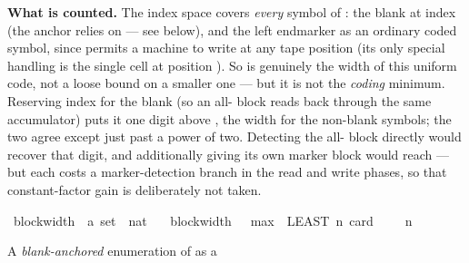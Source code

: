 \begin{isabellebody}
\begin{isamarkuptext}
  \textbf{What is counted.}  The index space 
  covers \emph{every} symbol of \isa{{\isasymGamma}}: the blank at index
   (the anchor  relies on --- see below), and
  the left endmarker  as an ordinary coded symbol, since
   permits a machine to write  at any tape
  position (its only special handling is the single  cell at
  position ).  So  is genuinely the width of
  this uniform code, not a loose bound on a smaller one --- but it is not
  the \emph{coding} minimum.  Reserving index  for the
  blank (so an all- block reads back through the same
  accumulator) puts it one digit above
  , the width for the
   non-blank symbols; the two agree except just
  past a power of two.  Detecting the all- block directly
  would recover that digit, and additionally giving  its own
  marker block would reach 
  --- but each costs a marker-detection branch in the read and write
  phases, so that constant-factor gain is deliberately not taken.%
\end{isamarkuptext}\isamarkuptrue%
\isamarkupfalse%
\ block{\isacharunderscore}{\kern0pt}width\ {\isacharcolon}{\kern0pt}{\isacharcolon}{\kern0pt}\ {\isachardoublequoteopen}{\isacharprime}{\kern0pt}a\ set\ {\isasymRightarrow}\ nat{\isachardoublequoteclose}\ \isanewline
\ \ {\isachardoublequoteopen}block{\isacharunderscore}{\kern0pt}width\ {\isasymGamma}\ {\isacharequal}{\kern0pt}\ max\ {}\ {\isacharparenleft}{\kern0pt}LEAST\ n{\isachardot}{\kern0pt}\ card\ {\isasymGamma}\ {\isasymle}\ {}\ {\isacharcircum}{\kern0pt}\ n{\isacharparenright}{\kern0pt}{\isachardoublequoteclose}%
\begin{isamarkuptext}%
A \emph{blank-anchored} enumeration of \isa{{\isasymGamma}} as a

\end{isamarkuptext}
\end{isabellebody}
